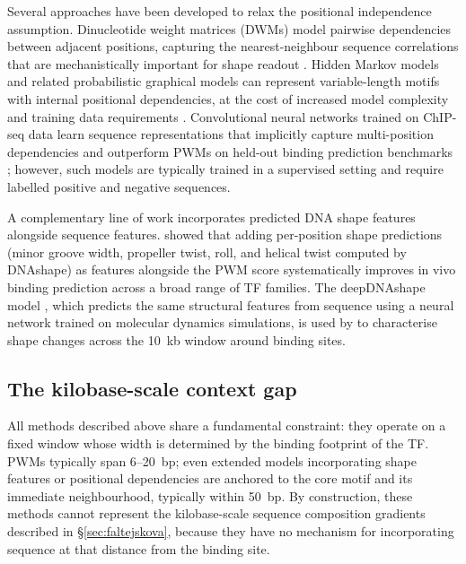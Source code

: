 Several approaches have been developed to relax the positional independence assumption.
Dinucleotide weight matrices (DWMs) model pairwise dependencies between adjacent positions, capturing the nearest-neighbour sequence correlations that are mechanistically important for
shape readout \cite{bulykNucleotidesTranscriptionFactor2002}.
Hidden Markov models and related probabilistic graphical models can represent variable-length motifs with internal positional dependencies, at the cost of increased model complexity and training data requirements \cite{weirauchEvaluationMethodsModeling2013}.
Convolutional neural networks trained on ChIP-seq data learn sequence representations that implicitly capture multi-position dependencies and outperform PWMs on held-out binding
prediction benchmarks \cite{alipanahiPredictingSequenceSpecificities2015};
however, such models are typically trained in a supervised setting and require labelled positive and negative sequences.

A complementary line of work incorporates predicted DNA shape features alongside sequence features.
\citet{mathelierDNAShapeFeatures2016} showed that adding per-position shape predictions (minor groove width, propeller twist, roll, and helical twist computed by DNAshape) as features alongside the PWM score systematically improves in vivo binding prediction across a broad range of TF families.
The deepDNAshape model \cite{liPredictingDNAStructure2024}, which predicts the same structural features from sequence using a neural network trained on molecular dynamics simulations, is used by \citet{faltejskovaNonconsensusFlankingSequence2026a} to characterise shape changes across the 10~kb window around binding sites.

\subsection{The kilobase-scale context gap}
\label{sec:motif-gap}

All methods described above share a fundamental constraint:
they operate on a fixed window whose width is determined by the binding footprint of the TF.
PWMs typically span 6--20~bp; even extended models incorporating shape features or positional dependencies are anchored to the core motif and its immediate neighbourhood, typically within 50~bp.
By construction, these methods cannot represent the kilobase-scale sequence composition gradients described in §\ref{sec:faltejskova}, because they have no mechanism for incorporating sequence at that distance from the binding site.

